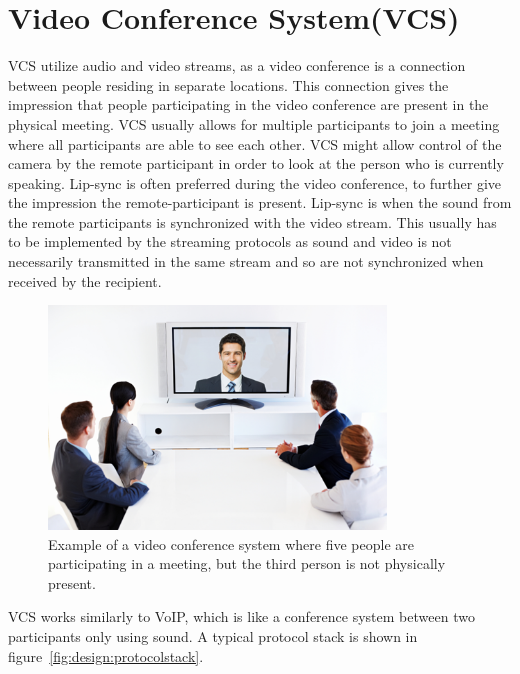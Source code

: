 \section{Video Conference System(VCS)} \label{sec:design:vcs}
\ac{VCS} utilize audio and video streams, as a video conference is a connection between people residing in separate locations. This connection gives the impression that people participating in the video conference are present in the physical meeting. VCS usually allows for multiple participants to join a meeting where all participants are able to see each other. VCS might allow control of the camera by the remote participant in order to look at the person who is currently speaking. 
Lip-sync is often preferred during the video conference, to further give the impression the remote-participant is present. Lip-sync is when the sound from the remote participants is synchronized with the video stream. This usually has to be implemented by the streaming protocols as sound and video is not necessarily transmitted in the same stream and so are not synchronized when received by the recipient.

\begin{figure}[H]
	\centering
	\includegraphics[width=0.8\textwidth]{figures/vcs_overview.png}
	\caption{Example of a video conference system where five people are participating in a meeting, but the third person is not physically present.} \label{fig:design:vcs}
\end{figure}

\ac{VCS} works similarly to \ac{VoIP}, which is like a conference system between two participants only using sound. A typical protocol stack is shown in figure~\ref{fig:design:protocolstack}. 

